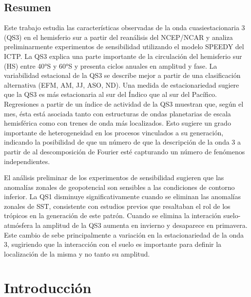 \documentclass[spanish,a4paper,12pt,oneside]{book}
\begin{document}
\begin{center}\begin{minipage}{\dimexpr\paperwidth-7cm}
\chapter*{Resumen}

Este trabajo estudia las características observadas de la onda cuasiestacionaria 3 (QS3) en el hemisferio sur a partir del reanálisis del NCEP/NCAR y analiza preliminarmente experimentos de sensibilidad utilizando el modelo SPEEDY del ICTP. La QS3 explica una parte importante de la circulación del hemisferio sur (HS) entre 40°S y 60°S y presenta ciclos anuales en amplitud y fase. La variabilidad estacional de la QS3 se describe mejor a partir de una clasificación alternativa (EFM, AM, JJ, ASO, ND). Una medida de estacionariedad sugiere que la QS3 es más estacionaria al sur del Índico que al sur del Pacífico. Regresiones a partir de un índice de actividad de la QS3 muestran que, según el mes, ésta está asociada tanto con estructuras de ondas planetarias de escala hemisférica como con trenes de onda más localizados. Esto sugiere un grado importante de heterogeneidad en los procesos vinculados a su generación, indicando la posibilidad de que un número de que la descripción de la onda 3 a partir de al descomposición de Fourier esté capturando un número de fenómenos independientes. 

El análisis preliminar de los experimentos de sensibilidad sugieren que las anomalías zonales de geopotencial son sensibles a las condiciones de contorno inferior. La QS1 disminuye significativamente cuando se eliminan las anomalías zonales de SST, consistente con estudios previos que resaltaban el rol de los trópicos en la generación de este patrón. Cuando se elimina la interación suelo-atmósfera la amplitud de la QS3 aumenta en invierno y desaparece en primavera. Este cambio de sebe principalmente a variación en la estacionariedad de la onda 3, sugiriendo que la interacción con el suelo es importante para definir la localización de la misma y no tanto su amplitud. 

\end{minipage}
\end{center}

\setcounter{tocdepth}{3} \tableofcontents

\listoffigures
\newpage

\mainmatter

\chapter{Introducción}\label{introduccion}
\end{document}

